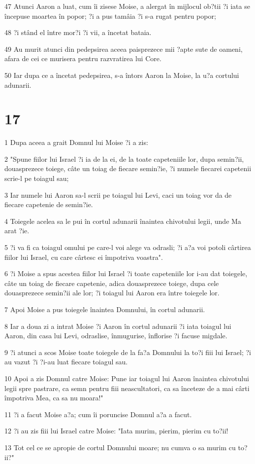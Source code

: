 \par 47 Atunci Aaron a luat, cum îi zisese Moise, a alergat în mijlocul ob?tii ?i iata se începuse moartea în popor; ?i a pus tamâia ?i s-a rugat pentru popor;
\par 48 ?i stând el între mor?i ?i vii, a încetat bataia.
\par 49 Au murit atunci din pedepsirea aceea paisprezece mii ?apte sute de oameni, afara de cei ce murisera pentru razvratirea lui Core.
\par 50 Iar dupa ce a încetat pedepsirea, s-a întors Aaron la Moise, la u?a cortului adunarii.

\chapter{17}

\par 1 Dupa aceea a grait Domnul lui Moise ?i a zis:
\par 2 "Spune fiilor lui Israel ?i ia de la ei, de la toate capeteniile lor, dupa semin?ii, douasprezece toiege, câte un toiag de fiecare semin?ie, ?i numele fiecarei capetenii scrie-l pe toiagul sau;
\par 3 Iar numele lui Aaron sa-l scrii pe toiagul lui Levi, caci un toiag vor da de fiecare capetenie de semin?ie.
\par 4 Toiegele acelea sa le pui în cortul adunarii înaintea chivotului legii, unde Ma arat ?ie.
\par 5 ?i va fi ca toiagul omului pe care-l voi alege va odrasli; ?i a?a voi potoli cârtirea fiilor lui Israel, cu care cârtesc ei împotriva voastra".
\par 6 ?i Moise a spus acestea fiilor lui Israel ?i toate capeteniile lor i-au dat toiegele, câte un toiag de fiecare capetenie, adica douasprezece toiege, dupa cele douasprezece semin?ii ale lor; ?i toiagul lui Aaron era între toiegele lor.
\par 7 Apoi Moise a pus toiegele înaintea Domnului, în cortul adunarii.
\par 8 Iar a doua zi a intrat Moise ?i Aaron în cortul adunarii ?i iata toiagul lui Aaron, din casa lui Levi, odraslise, înmugurise, înflorise ?i facuse migdale.
\par 9 ?i atunci a scos Moise toate toiegele de la fa?a Domnului la to?i fiii lui Israel; ?i au vazut ?i ?i-au luat fiecare toiagul sau.
\par 10 Apoi a zis Domnul catre Moise: Pune iar toiagul lui Aaron înaintea chivotului legii spre pastrare, ca semn pentru fiii neascultatori, ca sa înceteze de a mai cârti împotriva Mea, ca sa nu moara!"
\par 11 ?i a facut Moise a?a; cum îi poruncise Domnul a?a a facut.
\par 12 ?i au zis fiii lui Israel catre Moise: "Iata murim, pierim, pierim cu to?ii!
\par 13 Tot cel ce se apropie de cortul Domnului moare; nu cumva o sa murim cu to?ii?"

